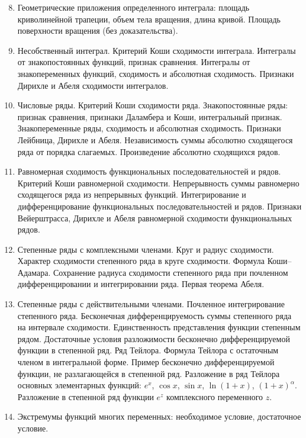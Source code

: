 \documentclass[12pt,a4paper]{article}
\begin{document}
\begin{enumerate}
\setcounter{enumi}{7}
\item Геометрические приложения определенного интеграла: площадь криволинейной
трапеции, объем тела вращения, длина кривой. Площадь поверхности вращения (без
доказательства).

\item Несобственный интеграл. Критерий Коши сходимости интеграла. Интегралы от
знакопостоянных функций, признак сравнения. Интегралы от знакопеременных
функций, сходимость и абсолютная сходимость. Признаки Дирихле и Абеля
сходимости интегралов.

\item Числовые ряды. Критерий Коши сходимости ряда. Знакопостоянные ряды:
признак сравнения, признаки Даламбера и Коши, интегральный признак.
Знакопеременные ряды, сходимость и абсолютная сходимость. Признаки Лейбница,
Дирихле и Абеля. Независимость суммы абсолютно сходящегося ряда от порядка
слагаемых. Произведение абсолютно сходящихся рядов.

\item Равномерная сходимость функциональных последовательностей и рядов.
Критерий Коши равномерной сходимости. Непрерывность суммы равномерно
сходящегося ряда из непрерывных функций. Интегрирование и дифференцирование
функциональных последовательностей и рядов. Признаки Вейерштрасса, Дирихле и
Абеля равномерной сходимости функциональных рядов.

\item Степенные ряды с комплексными членами. Круг и радиус сходимости. Характер
сходимости степенного ряда в круге сходимости. Формула Коши--Адамара.
Сохранение радиуса сходимости степенного ряда при почленном дифференцировании
и интегрировании ряда. Первая теорема Абеля.

\item Степенные ряды с действительными членами. Почленное интегрирование
степенного ряда. Бесконечная дифференцируемость суммы степенного ряда на
интервале сходимости. Единственность представления функции степенным рядом.
Достаточные условия разложимости бесконечно дифференцируемой функции в
степенной ряд. Ряд Тейлора. Формула Тейлора с остаточным членом в интегральной
форме. Пример бесконечно дифференцируемой функции, не разлагающейся в
степенной ряд. Разложение в ряд Тейлора основных элементарных функций:
$e^x$, $\cos x$, $\sin x$, $\ln(1+x)$, $(1+x)^\alpha$. Разложение в степенной
ряд функции $e^z$ комплексного переменного $z$.

\item Экстремумы функций многих переменных: необходимое условие, достаточное
условие.
\end{enumerate}
\end{document}
